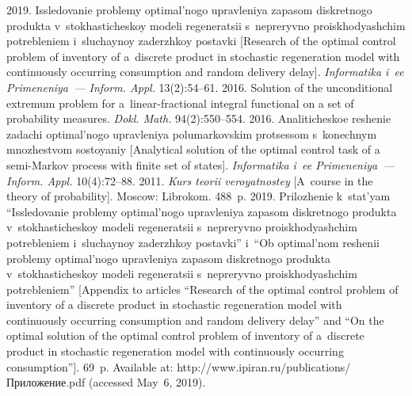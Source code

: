 


  \begin{multicols}{2}

\renewcommand{\bibname}{\protect\rmfamily References}

{\small\frenchspacing
 {%
 \begin{thebibliography}{9}
 
 \vspace*{-2pt}
 
 2019. Issledovanie problemy 
optimal'nogo upravleniya zapasom diskretnogo produkta v~stokhasticheskoy 
modeli regeneratsii s~nepreryvno proiskhodyashchim potrebleniem i~sluchaynoy 
za\-derzh\-koy postavki [Research of the optimal control problem of inventory of 
a~discrete product in stochastic regeneration model with continuously occurring 
consumption and random delivery delay]. \textit{Informatika i~ee Primeneniya~--- 
Inform. Appl.} 13(2):54--61.
 2016. Solution of the unconditional extremum problem for 
a~linear-fractional integral functional on a set of probability measures. \textit{Dokl. 
Math.} 94(2):550--554.
 2016. 
Analiticheskoe reshenie zadachi optimal'nogo upravleniya polumarkovskim 
protsessom s~konechnym mnozhestvom sostoyaniy [Analytical solution of the 
optimal control task of a semi-Markov process with finite set of states]. 
\textit{Informatika i~ee Primeneniya~--- Inform. Appl.} 10(4):72--88.
 2011. \textit{Kurs teorii veroyatnostey} [A~course in the 
theory of probability]. Moscow:  Librokom. 488~p.
 2019. Prilozhenie k~stat'yam 
``Issledovanie problemy optimal'nogo upravleniya zapasom diskretnogo produkta 
v~sto\-kha\-sti\-che\-skoy mo\-de\-li regeneratsii s~nepreryvno proiskhodyashchim 
potrebleniem i~sluchaynoy zaderzhkoy postavki'' i~``Ob optimal'nom reshenii 
problemy optimal'nogo upravleniya zapasom diskretnogo produkta 
v~stokhasticheskoy mo\-de\-li regeneratsii s~nepreryvno proiskhodyashchim 
po\-treb\-le\-ni\-em'' [Appendix to articles ``Research of the optimal control problem of 
inventory of a discrete product in stochastic regeneration model with 
continuously occurring consumption and random delivery delay'' and ``On the 
optimal solution of the optimal control problem of inventory of a~discrete product 
in stochastic regeneration model with continuously occurring consumption'']. 
69~p. Available at: {\sf http://www.ipiran.ru/publications/Приложение.pdf} 
(accessed May~6, 2019). 
\end{thebibliography}

 }
 }

\end{multicols}

